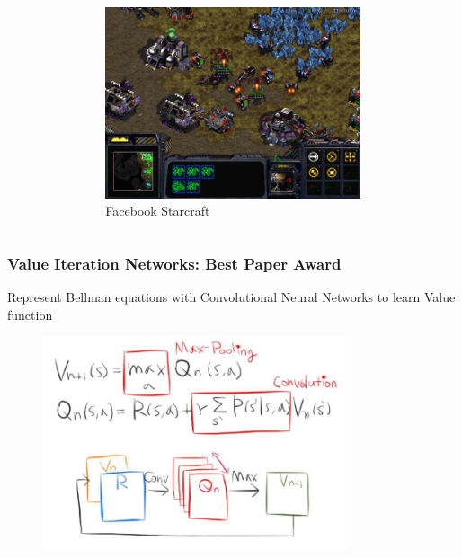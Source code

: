 \documentclass[11pt,
               hyperref={colorlinks,citecolor=pink,linkcolor=red,urlcolor=blue}
               ]{beamer}
\begin{document}
\begin{frame}
\begin{columns}
\begin{column}{0.33\textwidth}
\begin{figure}
        \end{figure}
      \end{column}
      \begin{column}{0.33\textwidth}
        \begin{figure}
          \centering
          \caption*{Facebook Starcraft}
          \includegraphics[width=0.8\textwidth]{drlApp3.png}
        \end{figure}
      \end{column}
    \end{columns}

  \end{frame}

  \begin{frame}
    \frametitle{Value Iteration Networks: Best Paper Award}

    \centering
    Represent Bellman equations with Convolutional Neural Networks to learn Value function
    \begin{figure}
      \centering
      \includegraphics[width=0.8\textwidth]{drl2.png}
    \end{figure}

  \end{frame}
\end{document}
